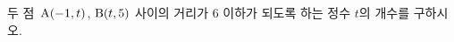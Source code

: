 두 점~$\mathrm{A}(-1{,}\mkern3mu\mathopen{}t)$, $\mathrm{B}(t{,}\mkern3mu\mathopen{}5)$ 사이의 거리가 $6$ 이하가 되도록 하는 정수 $t$의 개수를 구하시오.
